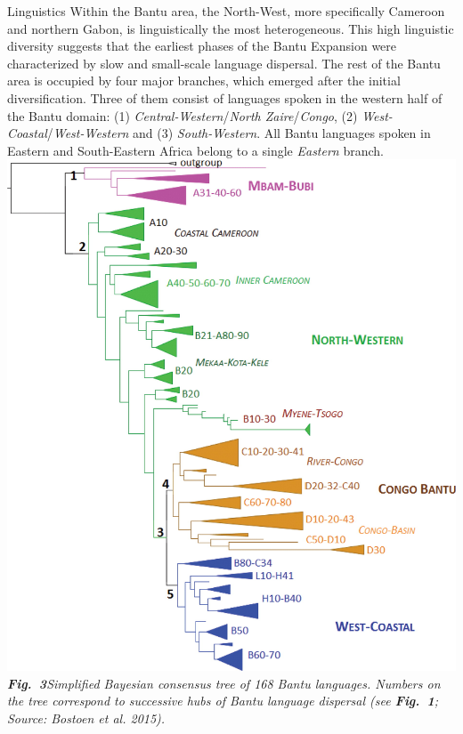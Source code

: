 \documentclass[a0]{sciposter}
\begin{document}
{\begin{minipage}[t][102cm][t]{82cm}
\begin{minipage}[t]{77cm}
\begin{multicols}{3}
\vfill\null
\columnbreak
{\fontsize{38}{42} \selectfont \textcolor{HeadCol}{Linguistics}}
\bigbreak
{\fontsize{28}{36} \selectfont Within the Bantu area, the North-West, more specifically Cameroon and northern Gabon, is linguistically the most heterogeneous. This high linguistic diversity suggests that the earliest phases of the Bantu Expansion were characterized by slow and small-scale language dispersal. The rest of the Bantu area is occupied by four major branches, which emerged after the initial diversification. Three of them consist of languages spoken in the western half of the Bantu domain: (1) \textit{Central-Western}/\textit{North Zaire}/\textit{Congo}, (2) \textit{West-Coastal}/\textit{West-Western} and (3) \textit{South-Western}. All Bantu languages spoken in Eastern and South-Eastern Africa belong to a single \textit{Eastern} branch.}
\bigbreak
\includegraphics[width = \linewidth, height=1.125\linewidth]{img/fg3_online.jpeg}
\bigbreak
{\fontsize{22}{0} \selectfont \textit{\textbf{Fig.~3}\hspace{1em}Simplified Bayesian consensus tree of 168 Bantu languages. Numbers on the tree correspond to successive hubs of Bantu language dispersal (see \textbf{Fig.~1}; Source: Bostoen et al. 2015).}}

\end{multicols}
\end{minipage}
\end{minipage}}
\end{document}
